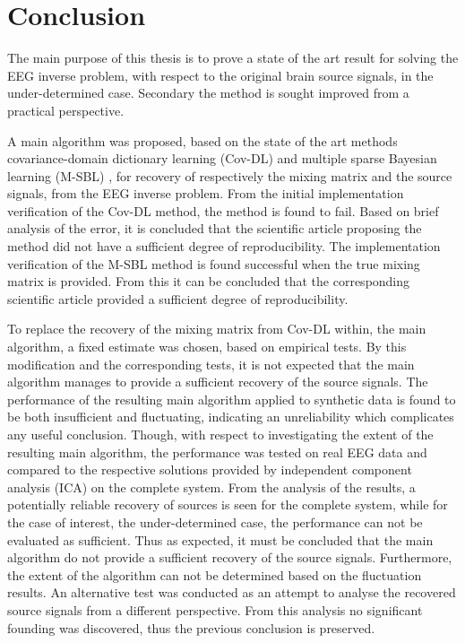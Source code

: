 \chapter{Conclusion}
The main purpose of this thesis is to prove a state of the art result for solving the EEG inverse problem, with respect to the original brain source signals, in the under-determined case.
Secondary the method is sought improved from a practical perspective.

A main algorithm was proposed, based on the state of the art methods covariance-domain dictionary learning (Cov-DL) \cite{Balkan2015} and multiple sparse Bayesian learning (M-SBL) \cite{Balkan2014}, for recovery of respectively the mixing matrix and the source signals, from the EEG inverse problem. 
From the initial implementation verification of the Cov-DL method, the method is found to fail. Based on brief analysis of the error, it is concluded that the scientific article proposing the method did not have a sufficient degree of reproducibility. 
The implementation verification of the M-SBL method is found successful when the true mixing matrix is provided. From this it can be concluded that the corresponding scientific article provided a sufficient degree of reproducibility. 

To replace the recovery of the mixing matrix from Cov-DL within, the main algorithm, a fixed estimate was chosen, based on empirical tests.
By this modification and the corresponding tests, it is not expected that the main algorithm manages to provide a sufficient recovery of the source signals. The performance of the resulting main algorithm applied to synthetic data is found to be both insufficient and fluctuating, indicating an unreliability which complicates any useful conclusion. 
Though, with respect to investigating the extent of the resulting main algorithm, the performance was tested on real EEG data and compared to the respective solutions provided by independent component analysis (ICA) on the complete system. 
From the analysis of the results, a potentially reliable recovery of sources is seen for the complete system, while for the case of interest, the under-determined case, the performance can not be evaluated as sufficient. Thus as expected, it must be concluded that the main algorithm do not provide a sufficient recovery of the source signals. Furthermore, the extent of the algorithm can not be determined based on the fluctuation results. 
An alternative test was conducted as an attempt to analyse the recovered source signals from a different perspective. From this analysis no significant founding was discovered, thus the previous conclusion is preserved. 

